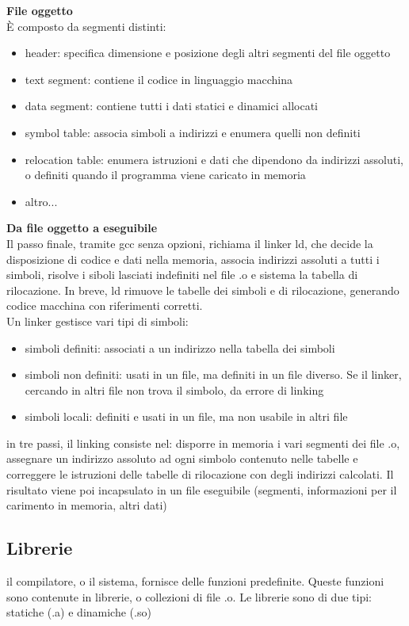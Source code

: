 \documentclass[12pt, a4paper]{article}
\begin{document}
\newpage
\textbf{File oggetto}\\ È composto da segmenti distinti:
\begin{itemize}
  \item header: specifica dimensione e posizione degli altri segmenti del file oggetto
  \item text segment: contiene il codice in linguaggio macchina
  \item data segment: contiene tutti i dati statici e dinamici allocati
  \item symbol table: associa simboli a indirizzi e enumera quelli non definiti
  \item relocation table: enumera istruzioni e dati che dipendono da indirizzi assoluti, o definiti 
  quando il programma viene caricato in memoria
  \item altro...
\end{itemize}

\textbf{Da file oggetto a eseguibile}\\ Il passo finale, tramite gcc senza opzioni, richiama il linker ld, che decide
la disposizione di codice e dati nella memoria, associa indirizzi assoluti a tutti i simboli, risolve i siboli 
lasciati indefiniti nel file .o e sistema la tabella di rilocazione. In breve, ld rimuove le tabelle dei simboli  e 
di rilocazione, generando codice macchina con riferimenti corretti.\\
Un linker gestisce vari tipi di simboli:
\begin{itemize}
  \item simboli definiti: associati a un indirizzo nella tabella dei simboli
  \item simboli non definiti: usati in un file, ma definiti in un file diverso. Se il linker, cercando in altri file 
  non trova il simbolo, da errore di linking
  \item simboli locali:  definiti e usati in un file, ma non usabile in altri file
\end{itemize}
in tre passi, il linking consiste nel: disporre in memoria i vari segmenti dei file .o, assegnare un indirizzo assoluto
ad ogni simbolo contenuto nelle tabelle e correggere le istruzioni delle tabelle di rilocazione con degli indirizzi 
calcolati. Il risultato viene poi incapsulato in un file eseguibile (segmenti, informazioni per il carimento in memoria,
altri dati)

\subsection{Librerie}
il compilatore, o il sistema, fornisce delle funzioni predefinite. Queste funzioni sono contenute in librerie, o collezioni
di file .o. Le librerie sono di due tipi: statiche (.a) e dinamiche (.so)
\end{document}
